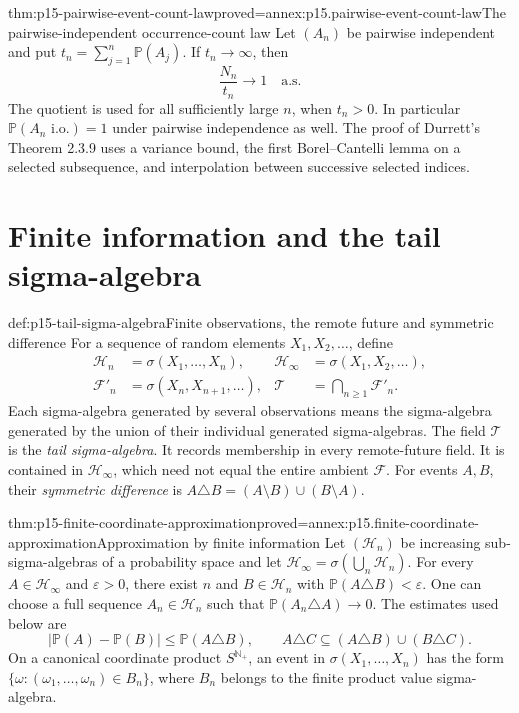 \begin{hbtheorem}{thm:p15-pairwise-event-count-law}{proved=annex:p15.pairwise-event-count-law}{The pairwise-independent occurrence-count law}
Let \((A_n)\) be pairwise independent and put
\(t_n=\sum_{j=1}^n\mathbb P(A_j)\). If \(t_n\to\infty\), then
\[
                       \frac{N_n}{t_n}\longrightarrow1\quad\text{a.s.}
\]
The quotient is used for all sufficiently large \(n\), when \(t_n>0\).
In particular \(\mathbb P(A_n\text{ i.o.})=1\) under pairwise
independence as well. The proof of Durrett's Theorem 2.3.9 uses
a variance bound, the first Borel--Cantelli lemma on a selected
subsequence, and interpolation between successive selected indices.
\end{hbtheorem}

\section{Finite information and the tail sigma-algebra}
\label{sec:p15-tail-information}

\begin{hbdefinition}{def:p15-tail-sigma-algebra}{Finite observations, the remote future and symmetric difference}
For a sequence of random elements \(X_1,X_2,\ldots\), define
\[
 \begin{aligned}
 \mathcal H_n&=\sigma(X_1,\ldots,X_n),&
 \mathcal H_\infty&=\sigma(X_1,X_2,\ldots),\\
 \mathcal F'_n&=\sigma(X_n,X_{n+1},\ldots),&
 \mathcal T&=\bigcap_{n\geq1}\mathcal F'_n.
 \end{aligned}
\]
Each sigma-algebra generated by several observations means the
sigma-algebra generated by the union of their individual generated
sigma-algebras. The field \(\mathcal T\) is the \emph{tail sigma-algebra}.
It records membership in every remote-future field. It is contained
in \(\mathcal H_\infty\), which need not equal the entire ambient
\(\mathcal F\).
For events \(A,B\), their \emph{symmetric difference} is
\(A\triangle B=(A\setminus B)\cup(B\setminus A)\).
\end{hbdefinition}

\begin{hbtheorem}{thm:p15-finite-coordinate-approximation}{proved=annex:p15.finite-coordinate-approximation}{Approximation by finite information}
Let \((\mathcal H_n)\) be increasing sub-sigma-algebras of a
probability space and let \(\mathcal H_\infty=\sigma(\bigcup_n\mathcal H_n)\).
For every \(A\in\mathcal H_\infty\) and \(\varepsilon>0\),
there exist \(n\) and \(B\in\mathcal H_n\) with
\(\mathbb P(A\triangle B)<\varepsilon\).
One can choose a full sequence \(A_n\in\mathcal H_n\) such that
\(\mathbb P(A_n\triangle A)\to0\).
The estimates used below are
\[
 |\mathbb P(A)-\mathbb P(B)|\leq\mathbb P(A\triangle B),
 \qquad
 A\triangle C\subseteq(A\triangle B)\cup(B\triangle C).
\]
On a canonical coordinate product \(S^{\mathbb N_+}\), an event
in \(\sigma(X_1,\ldots,X_n)\) has the form
\(\{\omega:(\omega_1,\ldots,\omega_n)\in B_n\}\),
where \(B_n\) belongs to the finite product value sigma-algebra.
\end{hbtheorem}

